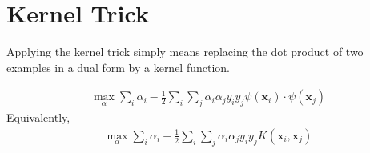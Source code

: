 \section{Kernel Trick}
\label{sec:kernel_trick}
Applying the kernel trick simply means replacing the dot product of two examples in a dual form by a kernel function. 

\begin{align}
	 \max_\alpha \sum_i \alpha_i -\frac{1}{2}\sum_i\sum_j \alpha_i\alpha_j y_iy_j \psi(\mathbf{x}_i)\cdot \psi(\mathbf{x}_j)
	 \label{eq:kernel_dual_form}
\end{align}
Equivalently, 
\begin{align}
	 \max_\alpha \sum_i \alpha_i -\frac{1}{2}\sum_i\sum_j \alpha_i\alpha_j y_iy_j K(\mathbf{x}_i,\mathbf{x}_j)
\end{align}
